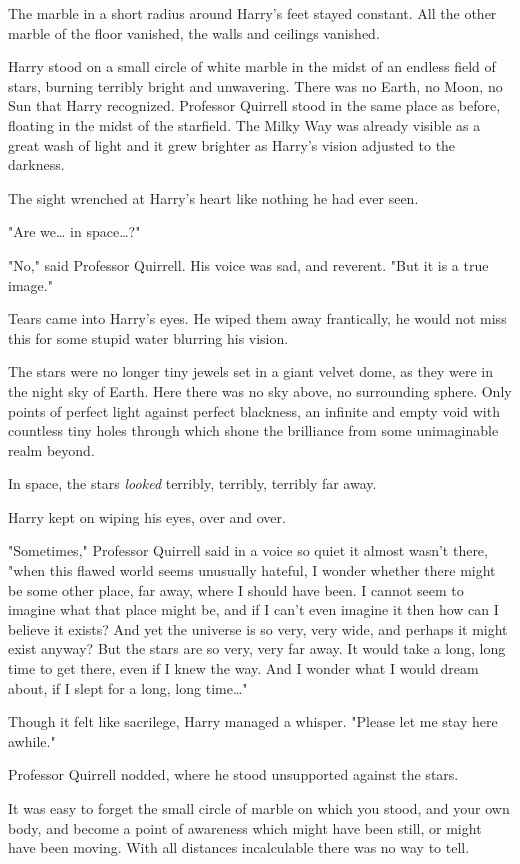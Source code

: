 The marble in a short radius around Harry's feet stayed constant. All the other
marble of the floor vanished, the walls and ceilings vanished.

Harry stood on a small circle of white marble in the midst of an endless field
of stars, burning terribly bright and unwavering. There was no Earth, no Moon,
no Sun that Harry recognized. Professor Quirrell stood in the same place as
before, floating in the midst of the starfield. The Milky Way was already
visible as a great wash of light and it grew brighter as Harry's vision
adjusted to the darkness.

The sight wrenched at Harry's heart like nothing he had ever seen.

"Are we{\ldots} in space{\ldots}?"

"No," said Professor Quirrell. His voice was sad, and reverent. "But it is a
true image."

Tears came into Harry's eyes. He wiped them away frantically, he would not miss
this for some stupid water blurring his vision.

The stars were no longer tiny jewels set in a giant velvet dome, as they were
in the night sky of Earth. Here there was no sky above, no surrounding sphere.
Only points of perfect light against perfect blackness, an infinite and empty
void with countless tiny holes through which shone the brilliance from some
unimaginable realm beyond.

In space, the stars \emph{looked} terribly, terribly, terribly far away.

Harry kept on wiping his eyes, over and over.

"Sometimes," Professor Quirrell said in a voice so quiet it almost wasn't
there, "when this flawed world seems unusually hateful, I wonder whether there
might be some other place, far away, where I should have been. I cannot seem to
imagine what that place might be, and if I can't even imagine it then how can I
believe it exists? And yet the universe is so very, very wide, and perhaps it
might exist anyway? But the stars are so very, very far away. It would take a
long, long time to get there, even if I knew the way. And I wonder what I would
dream about, if I slept for a long, long time{\ldots}"

Though it felt like sacrilege, Harry managed a whisper. "Please let me stay
here awhile."

Professor Quirrell nodded, where he stood unsupported against the stars.

It was easy to forget the small circle of marble on which you stood, and your
own body, and become a point of awareness which might have been still, or might
have been moving. With all distances incalculable there was no way to tell.

